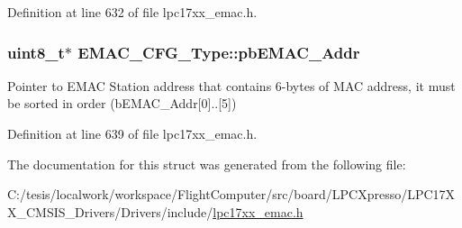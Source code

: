 \-Definition at line 632 of file lpc17xx\-\_\-emac.\-h.

\hypertarget{struct_e_m_a_c___c_f_g___type_a70a70b7a54816afd0f73f88cf238fa22}{
\subsubsection[{pb\-E\-M\-A\-C\-\_\-\-Addr}]{\setlength{\rightskip}{0pt plus 5cm}uint8\-\_\-t$\ast$ {\bf \-E\-M\-A\-C\-\_\-\-C\-F\-G\-\_\-\-Type\-::pb\-E\-M\-A\-C\-\_\-\-Addr}}}\label{struct_e_m_a_c___c_f_g___type_a70a70b7a54816afd0f73f88cf238fa22}
\-Pointer to \-E\-M\-A\-C \-Station address that contains 6-\/bytes of \-M\-A\-C address, it must be sorted in order (b\-E\-M\-A\-C\-\_\-\-Addr\mbox{[}0\mbox{]}..\mbox{[}5\mbox{]}) 

\-Definition at line 639 of file lpc17xx\-\_\-emac.\-h.



\-The documentation for this struct was generated from the following file\-:\begin{DoxyCompactItemize}
\item 
\-C\-:/tesis/localwork/workspace/\-Flight\-Computer/src/board/\-L\-P\-C\-Xpresso/\-L\-P\-C17\-X\-X\-\_\-\-C\-M\-S\-I\-S\-\_\-\-Drivers/\-Drivers/include/\hyperlink{lpc17xx__emac_8h}{lpc17xx\-\_\-emac.\-h}\end{DoxyCompactItemize}
